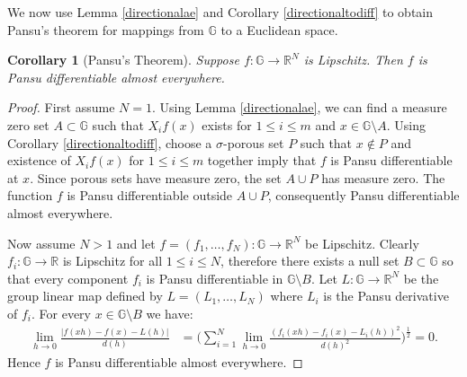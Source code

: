 \documentclass[reqno, 11pt]{amsart}
\newtheorem{corollary}[theorem]{Corollary}
\theoremstyle{definition}
\theoremstyle{remark}
\numberwithin{theorem}{section}
\numberwithin{equation}{section}
\begin{document}
We now use Lemma \ref{directionalae} and Corollary \ref{directionaltodiff} to obtain Pansu's theorem for mappings from $\mathbb{G}$ to a Euclidean space.

\begin{corollary}[Pansu's Theorem]\label{Pansucor}
Suppose $f\colon \mathbb{G}\to \mathbb{R}^N$ is Lipschitz. Then $f$ is Pansu differentiable almost everywhere.
\end{corollary}

\begin{proof} 
First assume $N=1$. Using Lemma \ref{directionalae}, we can find a measure zero set $A\subset \mathbb{G}$ such that $X_{i}f(x)$ exists for $1\leq i\leq m$ and $x\in \mathbb{G}\setminus A$. Using Corollary \ref{directionaltodiff}, choose a $\sigma$-porous set $P$ such that $x\notin P$ and existence of $X_{i}f(x)$ for $1\leq i\leq m$ together imply that $f$ is Pansu differentiable at $x$. Since porous sets have measure zero, the set $A\cup P$ has measure zero. The function $f$ is Pansu differentiable outside $A\cup P$, consequently Pansu differentiable almost everywhere.

Now assume $N>1$ and let $f=(f_1,\ldots, f_N)\colon \mathbb{G}\to \mathbb{R}^N$ be Lipschitz. Clearly $f_i\colon {\mathbb{G}}\to {\mathbb{R}}$ is Lipschitz for all $1\leq i\leq N$, therefore there exists a null set $B\subset \mathbb{G}$ so that every component $f_i$ is Pansu differentiable in $\mathbb{G}\setminus B$. Let $L\colon \mathbb{G}\to \mathbb{R}^N$ be the group linear map defined by $L=(L_1,\ldots, L_N)$ where $L_i$ is the Pansu derivative of $f_i$. For every $x\in \mathbb{G}\setminus B$ we have:
\begin{align*}
\lim_{h\to 0} \frac{|f(xh)-f(x)-L(h)|}{d(h)}&=\Big(\sum_{i=1}^N\lim_{h\to 0} \frac{(f_i(xh)-f_i(x)-L_i(h))^2}{d(h)^2}\Big)^{\frac{1}{2}}=0.
\end{align*}
Hence $f$ is Pansu differentiable almost everywhere.
\end{proof}
\end{document}
